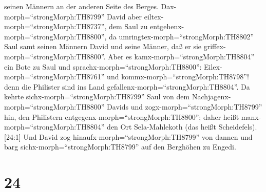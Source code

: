 seinen Männern an der anderen Seite des Berges.
Dax-morph=``strongMorph:TH8799'' David aber
eiltex-morph=``strongMorph:TH8737'', dem Saul zu
entgehenx-morph=``strongMorph:TH8800'', da
umringtex-morph=``strongMorph:TH8802'' Saul samt seinen Männern David
und seine Männer, daß er sie griffex-morph=``strongMorph:TH8800''.
 Aber es kamx-morph=``strongMorph:TH8804'' ein Bote zu Saul
und sprachx-morph=``strongMorph:TH8800'':
Eilex-morph=``strongMorph:TH8761'' und
kommx-morph=``strongMorph:TH8798''! denn die Philister sind ins Land
gefallenx-morph=``strongMorph:TH8804''.  Da kehrte
sichx-morph=``strongMorph:TH8799'' Saul von dem
Nachjagenx-morph=``strongMorph:TH8800'' Davids und
zogx-morph=``strongMorph:TH8799'' hin, den Philistern
entgegenx-morph=``strongMorph:TH8800''; daher heißt
manx-morph=``strongMorph:TH8804'' den Ort Sela-Mahlekoth (das heißt
Scheidefels).  {[}24:1{]} Und David zog
hinaufx-morph=``strongMorph:TH8799'' von dannen und barg
sichx-morph=``strongMorph:TH8799'' auf den Berghöhen zu Engedi.

\hypertarget{section-23}{%
\section{24}\label{section-23}}

